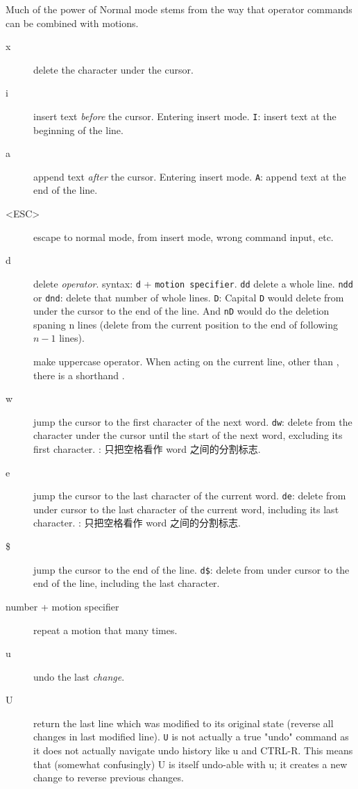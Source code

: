 \documentclass{article}
\newcommand{\syntax}[1]{\PVerb{#1}}
\begin{document}
Much of the power of Normal mode stems from the way that operator commands can be combined with motions.

\begin{description}
  \item[x] delete the character under the cursor.
  \item[i] insert text \emph{before} the cursor. Entering insert mode. \texttt{I}: insert text at the beginning of the line.
  \item[a] append text \emph{after} the cursor. Entering insert mode. \texttt{A}: append text at the end of the line.
  \item[<ESC>] escape to normal mode, from insert mode, wrong command input, etc.
  \item[d] delete \emph{operator}. syntax: \texttt{d} + \texttt{motion specifier}. \texttt{dd} delete a whole line. \texttt{ndd} or \texttt{dnd}: delete that number of whole lines. \verb|D|: Capital \verb|D| would delete from under the cursor to the end of the line. And \verb|nD| would do the deletion spaning n lines (delete from the current position to the end of following $n-1$ lines).
  \item[\syntax{gU}] make uppercase operator. When acting on the current line, other than \syntax{gUgU}, there is a shorthand \syntax{gUU}.
  \item[w] jump the cursor to the first character of the next word. \texttt{dw}: delete from the character under the cursor until the start of the next word, excluding its first character. \syntax{W}: 只把空格看作 word 之间的分割标志.
  \item[e] jump the cursor to the last character of the current word. \texttt{de}: delete from under cursor to the last character of the current word, including its last character. \syntax{E}: 只把空格看作 word 之间的分割标志.
  \item[\$] jump the cursor to the end of the line. \texttt{d\$}: delete from under cursor to the end of the line, including the last character.
\item[number + motion specifier] repeat a motion that many times. 
\item[u] undo the last \syntax{[count]} \emph{change}.
\item[U] return the last line which was modified to its original state (reverse all changes in last modified line). \texttt{U} is not actually a true "undo" command as it does not actually navigate undo history like u and CTRL-R. This means that (somewhat confusingly) U is itself undo-able with u; it creates a new change to reverse previous changes.

\end{description}
\end{document}

